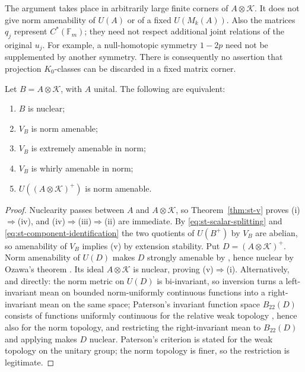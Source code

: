 \begin{remark}\label{rem:st-stable-essential}
The argument takes place in arbitrarily large finite corners of
\(A\otimes\mathcal K\). It does not give norm amenability of \(U(A)\) or
of a fixed \(U(M_k(A))\). Also the matrices \(q_j\) represent
\(C^*(\mathbb F_m)\); they need not respect additional joint relations
of the original \(u_j\). For example, a null-homotopic symmetry
\(1-2p\) need not be supplemented by another symmetry.
There is consequently no assertion that projection \(K_0\)-classes
can be discarded in a fixed matrix corner.
\end{remark}

\begin{corollary}\label{cor:st-nuclearity}
Let \(B=A\otimes\mathcal K\), with \(A\) unital. The following are equivalent:
\begin{enumerate}
\item \(B\) is nuclear;
\item \(V_B\) is norm amenable;
\item \(V_B\) is extremely amenable in norm;
\item \(V_B\) is whirly amenable in norm;
\item \(U((A\otimes\mathcal K)^+)\) is norm amenable.
\end{enumerate}
\end{corollary}
\begin{proof}
Nuclearity passes between \(A\) and \(A\otimes\mathcal K\), so Theorem~\ref{thm:st-v} proves (i)\(\Rightarrow\)(iv), and
(iv)\(\Rightarrow\)(iii)\(\Rightarrow\)(ii) are immediate.
By \eqref{eq:st-scalar-splitting} and \eqref{eq:st-component-identification}
the two quotients of \(U(B^+)\) by \(V_B\) are abelian, so amenability of
\(V_B\) implies (v) by extension stability.
Put \(D=(A\otimes\mathcal K)^+\). Norm amenability of \(U(D)\) makes \(D\)
strongly amenable by \cite[Theorem~2.6]{AlekseevSchmidtThom2025}, hence nuclear by Ozawa's
theorem \cite[Theorem~2.2]{AlekseevSchmidtThom2025}. Its ideal \(A\otimes\mathcal K\) is nuclear, proving
(v)\(\Rightarrow\)(i). Alternatively, and directly: the norm
metric on \(U(D)\) is bi-invariant, so inversion turns a left-invariant
mean on bounded norm-uniformly continuous functions into a
right-invariant mean on the same space; Paterson's invariant function
space \(B_{22}(D)\) consists of functions uniformly continuous for the
relative weak topology \cite[Proposition~3(d)]{Paterson1991}, hence also for
the norm topology, and restricting the right-invariant mean to
\(B_{22}(D)\) and applying \cite[Theorem~1]{Paterson1991} makes \(D\)
nuclear. Paterson's criterion is stated for the weak topology on the
unitary group; the norm topology is finer, so the restriction is
legitimate.
\end{proof}

